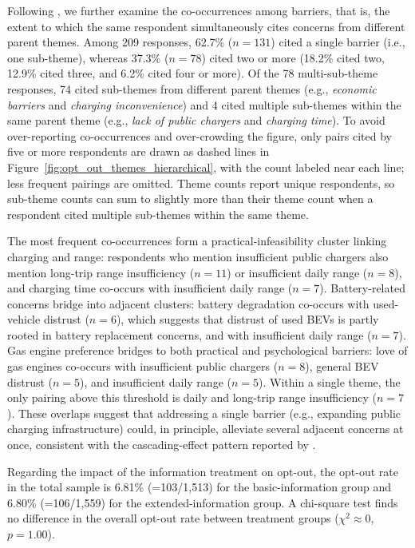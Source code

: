\documentclass[a4paper,fleqn]{cas-sc}   %
\begin{document}
Following \textcite{krishnaUnderstandingIdentifyingBarriers2021}, we further examine the co-occurrences among barriers, that is, the extent to which the same respondent simultaneously cites concerns from different parent themes. Among 209 responses, 62.7\% ($n=131$) cited a single barrier (i.e., one sub-theme), whereas 37.3\% ($n=78$) cited two or more (18.2\% cited two, 12.9\% cited three, and 6.2\% cited four or more). Of the 78 multi-sub-theme responses, 74 cited sub-themes from different parent themes (e.g., \textit{economic barriers} and \textit{charging inconvenience}) and 4 cited multiple sub-themes within the same parent theme (e.g., \textit{lack of public chargers} and \textit{charging time}). To avoid over-reporting co-occurrences and over-crowding the figure, only pairs cited by five or more respondents are drawn as dashed lines in Figure~\ref{fig:opt_out_themes_hierarchical}, with the count labeled near each line; less frequent pairings are omitted. Theme counts report unique respondents, so sub-theme counts can sum to slightly more than their theme count when a respondent cited multiple sub-themes within the same theme. 

The most frequent co-occurrences form a practical-infeasibility cluster linking charging and range: respondents who mention insufficient public chargers also mention long-trip range insufficiency ($n=11$) or insufficient daily range ($n=8$), and charging time co-occurs with insufficient daily range ($n=7$). Battery-related concerns bridge into adjacent clusters: battery degradation co-occurs with used-vehicle distrust ($n=6$), which suggests that distrust of used BEVs is partly rooted in battery replacement concerns, and with insufficient daily range ($n=7$). Gas engine preference bridges to both practical and psychological barriers: love of gas engines co-occurs with insufficient public chargers ($n=8$), general BEV distrust ($n=5$), and insufficient daily range ($n=5$). Within a single theme, the only pairing above this threshold is daily and long-trip range insufficiency ($n=7$). These overlaps suggest that addressing a single barrier (e.g., expanding public charging infrastructure) could, in principle, alleviate several adjacent concerns at once, consistent with the cascading-effect pattern reported by \textcite{krishnaUnderstandingIdentifyingBarriers2021}.

Regarding the impact of the information treatment on opt-out, the opt-out rate in the total sample is 6.81\% (=103/1,513) for the basic-information group and 6.80\% (=106/1,559) for the extended-information group. A chi-square test finds no difference in the overall opt-out rate between treatment groups ($\chi^2 \approx 0$, $p = 1.00$). 
\end{document}
